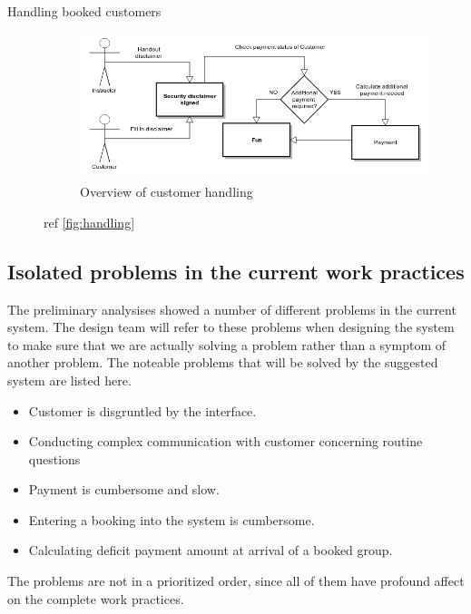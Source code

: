 \begin{description}
\item[Handling booked customers]

\begin{figure}[htbp]
    \centering
        \includegraphics[width=\textwidth]{figures/handling.png}
            \caption{Overview of customer handling}
        \label{fig:handling}
\end{figure}
ref \autoref{fig:handling}

\end{description}


\subsection{Isolated problems in the current work practices}
The preliminary analysises showed a number of different problems in the current system. 
The design team will refer to these problems when designing the system
to make sure that we are actually solving a problem rather than a symptom
of another problem. The noteable problems that will be solved by the suggested system are listed here.

\begin{itemize}
	\item Customer is disgruntled by the interface.
	\item Conducting complex communication with customer concerning routine questions
	\item Payment is cumbersome and slow.
	\item Entering a booking into the system is cumbersome.
	\item Calculating deficit payment amount at arrival of a booked group.
\end{itemize}

The problems are not in a prioritized order, since all of them have profound
affect on the complete work practices.


